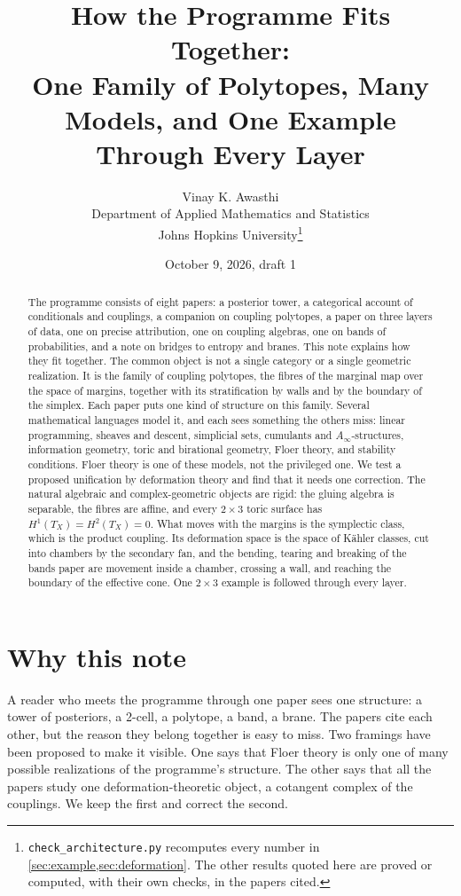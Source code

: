 \documentclass[11pt]{article}
\title{How the Programme Fits Together:\\ One Family of Polytopes, Many Models, and One Example Through Every Layer}
\author{Vinay K. Awasthi\\
Department of Applied Mathematics and Statistics\\
Johns Hopkins University\thanks{\texttt{check\_architecture.py} recomputes every number in \cref{sec:example,sec:deformation}. The other
results quoted here are proved or computed, with their own checks, in the papers cited.}}
\date{October 9, 2026, draft 1}
\theoremstyle{definition}
\theoremstyle{remark}
\begin{document}
\maketitle

\begin{abstract}
The programme consists of eight papers: a posterior tower, a categorical account of conditionals and couplings, a companion on coupling
polytopes, a paper on three layers of data, one on precise attribution, one on coupling algebras, one on bands of probabilities, and a note
on bridges to entropy and branes. This note explains how they fit together. The common object is not a single category or a single
geometric realization. It is the family of coupling polytopes, the fibres of the marginal map over the space of margins, together with its
stratification by walls and by the boundary of the simplex. Each paper puts one kind of structure on this family. Several mathematical
languages model it, and each sees something the others miss: linear programming, sheaves and descent, simplicial sets, cumulants and
$A_\infty$-structures, information geometry, toric and birational geometry, Floer theory, and stability conditions. Floer theory is one of
these models, not the privileged one. We test a proposed unification by deformation theory and find that it needs one correction. The
natural algebraic and complex-geometric objects are rigid: the gluing algebra is separable, the fibres are affine, and every $2\times3$ toric
surface has $H^1(T_X)=H^2(T_X)=0$. What moves with the margins is the symplectic class, which is the product coupling. Its deformation space
is the space of Kähler classes, cut into chambers by the secondary fan, and the bending, tearing and breaking of the bands paper are
movement inside a chamber, crossing a wall, and reaching the boundary of the effective cone. One $2\times3$ example is followed through every layer.
\end{abstract}

\tableofcontents

\section{Why this note}\label{sec:why}

A reader who meets the programme through one paper sees one structure: a tower of posteriors, a 2-cell, a polytope, a band, a brane. The
papers cite each other, but the reason they belong together is easy to miss. Two framings have been proposed to make it visible. One says
that Floer theory is only one of many possible realizations of the programme's structure. The other says that all the papers study one
deformation-theoretic object, a cotangent complex of the couplings. We keep the first and correct the second.
\end{document}
